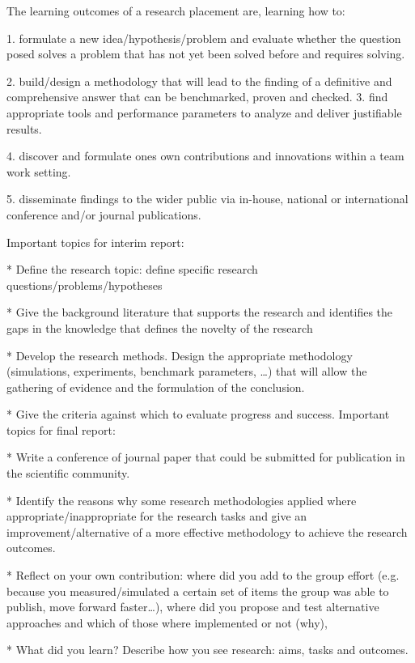 \documentclass[a4paper]{article}
\begin{document}
\vspace{5mm} 

The learning outcomes of a research placement are, learning how to:

1. formulate a new idea/hypothesis/problem and evaluate whether the question posed solves a problem that has not yet been solved before and requires solving.

2. build/design a methodology that will lead to the finding of a definitive and comprehensive answer that can be benchmarked, proven and checked.
3. find appropriate tools and performance parameters to analyze and deliver justifiable results.

4. discover and formulate ones own contributions and innovations within a team work setting.

5. disseminate findings to the wider public via in-house, national or international conference and/or journal publications.

\vspace{5mm} 
Important topics for interim report:

* Define the research topic: define specific research questions/problems/hypotheses

* Give the background literature that supports the research and identifies the gaps in the knowledge that defines the novelty of the research

* Develop the research methods. Design the appropriate methodology (simulations, experiments, benchmark parameters, …) that will allow the gathering of evidence and the formulation of the conclusion.

* Give the criteria against which to evaluate progress and success.
Important topics for final report:

* Write a conference of journal paper that could be submitted for publication in the scientific community.

* Identify the reasons why some research methodologies applied where appropriate/inappropriate for the research tasks and give an improvement/alternative of a more effective methodology to achieve the research outcomes.

* Reflect on your own contribution: where did you add to the group effort (e.g. because you measured/simulated a certain set of items the group was able to publish, move forward faster…), where did you propose and test alternative approaches and which of those where implemented or not (why),

* What did you learn? Describe how you see research: aims, tasks and outcomes.
\end{document}
